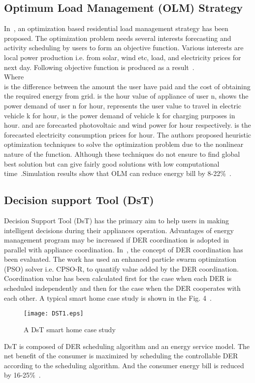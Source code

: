 \documentclass[journal]{IEEEtran}
\begin{document}
\subsection{Optimum Load Management (OLM) Strategy}
In~\cite{lujano2012optimum}, an optimization based residential load management strategy has been proposed. The optimization problem needs several interests forecasting and activity scheduling by users to form an objective function. Various interests are local power production i.e. from solar, wind etc, load, and electricity prices for next day. Following objective function is produced as a result~\cite{lujano2012optimum}.
\\
Where\\
 is the difference between the amount the user have paid and the cost of obtaining the required energy from grid.  is the  hour value of  appliance of user n,  shows the power demand of user n for  hour,  represents the user value to travel in electric vehicle k for  hour, is the power demand of vehicle k for charging purposes in  hour.  and  are forecasted photovoltaic and wind power for  hour respectively.  is the forecasted electricity consumption prices for  hour.
The authors proposed heuristic optimization techniques to solve the optimization problem due to the nonlinear nature of the function. Although these techniques do not ensure to find global best solution but can give fairly good solutions with low computational time~\cite{lujano2012optimum}.Simulation results show that OLM can reduce energy bill by 8-22\%~\cite{lujano2012optimum}.\\

\subsection{Decision support Tool (DsT)}
Decision Support Tool (DsT) has the primary aim to help  users in making intelligent decisions during their appliances operation. Advantages of energy management program may be increased if DER coordination is adopted in parallel with appliance coordination. In~\cite{pedrasa2010coordinated}, the concept of DER coordination has been evaluated. The work has used an enhanced particle swarm optimization (PSO) solver i.e. CPSO-R, to quantify value added by the DER coordination. Coordination value has been calculated first for the case when each DER is scheduled independently and then for the case when the DER cooperates with each other. A typical smart home case study is shown in the Fig. 4~\cite{pedrasa2010coordinated}.
\begin{figure}[!h]
\centering
\texttt{[image: DST1.eps]}
\caption{A DsT smart home case study}
\end{figure}
DsT is composed of DER scheduling algorithm and an energy service model. The net benefit of the consumer is maximized by scheduling the controllable DER according to the scheduling algorithm. And the consumer energy bill is reduced by 16-25\%~\cite{pedrasa2010coordinated}.
\end{document}

